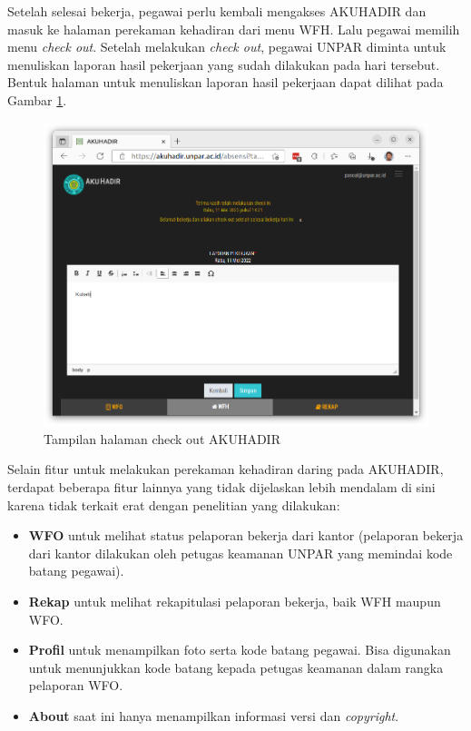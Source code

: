 Setelah selesai bekerja, pegawai perlu kembali mengakses AKUHADIR dan masuk ke halaman perekaman kehadiran dari menu WFH. Lalu pegawai memilih menu \textit{check out}. Setelah melakukan \textit{check out}, pegawai UNPAR diminta untuk menuliskan laporan hasil pekerjaan yang sudah dilakukan pada hari tersebut. Bentuk halaman untuk menuliskan laporan hasil pekerjaan dapat dilihat pada Gambar \ref{fig:akuhadir-4-wfh-checkout}.

\begin{figure}[H]
	\centering
	\includegraphics[scale=0.3]{Gambar/akuhadir-4-wfh-checkout.png}
	\caption{Tampilan halaman check out AKUHADIR} 
	\label{fig:akuhadir-4-wfh-checkout}
\end{figure}
Selain fitur untuk melakukan perekaman kehadiran daring pada AKUHADIR, terdapat beberapa fitur lainnya yang tidak dijelaskan lebih mendalam di sini karena tidak terkait erat dengan penelitian yang dilakukan:

\begin{itemize}
	\item \textbf{WFO} untuk melihat status pelaporan bekerja dari kantor (pelaporan bekerja dari kantor dilakukan oleh petugas keamanan UNPAR yang memindai kode batang pegawai).
	\item \textbf{Rekap} untuk melihat rekapitulasi pelaporan bekerja, baik WFH maupun WFO.
	\item \textbf{Profil} untuk menampilkan foto serta kode batang pegawai. Bisa digunakan untuk menunjukkan kode batang kepada petugas keamanan dalam rangka pelaporan WFO.
	\item \textbf{About} saat ini hanya menampilkan informasi versi dan \textit{copyright}.
\end{itemize}

